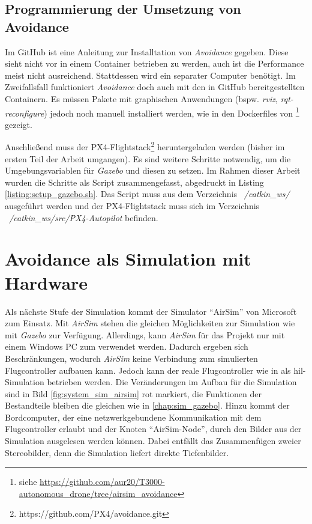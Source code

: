 \subsection{Programmierung der Umsetzung von Avoidance}
Im GitHub\cite{dronecodestiftungObstacleDetectionAvoidance2023} ist eine Anleitung zur Installtation von \textit{Avoidance} gegeben. Diese sieht nicht vor in einem Container betrieben zu werden, auch ist die Performance meist nicht ausreichend. Stattdessen wird ein separater Computer benötigt. Im Zweifallsfall funktioniert \textit{Avoidance} doch auch mit den in GitHub bereitgestellten Containern. Es müssen Pakete mit graphischen Anwendungen (bspw. \textit{rviz}, \textit{rqt-reconfigure}) jedoch noch manuell installiert werden, wie in den Dockerfiles von \cite[Kapitel 5]{markusreinErweiterungBestehenderDrohnen2023}\footnote{siehe \url{https://github.com/aur20/T3000-autonomous_drone/tree/airsim_avoidance}} gezeigt.

Anschließend muss der PX4-Flightstack\footnote{https://github.com/PX4/avoidance.git} heruntergeladen werden (bisher im ersten Teil der Arbeit umgangen). Es sind weitere Schritte notwendig, um die Umgebungsvariablen für \textit{Gazebo} und diesen zu setzen. Im Rahmen dieser Arbeit wurden die Schritte als Script zusammengefasst, abgedruckt in Listing \ref{listing:setup_gazebo.sh}. Das Script muss aus dem Verzeichnis \textit{~/catkin\_ws/} ausgeführt werden und der PX4-Flightstack muss sich im Verzeichnis \textit{~/catkin\_ws/src/PX4-Autopilot} befinden.

\section{Avoidance als Simulation mit Hardware}
Als nächste Stufe der Simulation kommt der Simulator \enquote{AirSim} von Microsoft zum Einsatz. Mit \textit{AirSim} stehen die gleichen Möglichkeiten zur Simulation wie mit \textit{Gazebo} zur Verfügung. Allerdings, kann \textit{AirSim} für das Projekt nur mit einem Windows PC zum verwendet werden. Dadurch ergeben sich Beschränkungen, wodurch \textit{AirSim} keine Verbindung zum simulierten Flugcontroller aufbauen kann. Jedoch kann der reale Flugcontroller wie in \cite[Kapitel 5]{markusreinErweiterungBestehenderDrohnen2023} als \gls{hil}-Simulation betrieben werden. Die Veränderungen im Aufbau für die Simulation sind in Bild \ref{fig:system_sim_airsim} rot markiert, die Funktionen der Bestandteile bleiben die gleichen wie in \cref{chap:sim_gazebo}. Hinzu kommt der Bordcomputer, der eine netzwerkgebundene Kommunikation mit dem Flugcontroller erlaubt und der Knoten \enquote{AirSim-Node}, durch den Bilder aus der Simulation ausgelesen werden können. Dabei entfällt das Zusammenfügen zweier Stereobilder, denn die Simulation liefert direkte Tiefenbilder.

